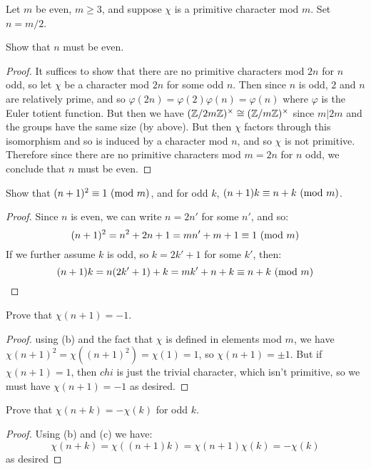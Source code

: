\documentclass[11pt]{article}
\begin{document}
Let $m$ be even, $m \ge 3$, and suppose $\chi$ is a primitive character mod $m$. Set $n = m/2$.

Show that $n$ must be even.
\begin{proof}
  It suffices to show that there are no primitive characters mod $2n$ for $n$ odd, so let $\chi$ be a character mod $2n$ for some odd $n$.
  Then since $n$ is odd, $2$ and $n$ are relatively prime, and so $\varphi(2n) = \varphi(2)\varphi(n) = \varphi(n)$ where $\varphi$ is the Euler totient function.
  But then we have $(\mathbb{Z}/2m\mathbb{Z})^\times \cong (\mathbb{Z}/m\mathbb{Z})^\times$ since $m | 2m$ and the groups have the same size (by above).
  But then $\chi$ factors through this isomorphism and so is induced by a character mod $n$, and so $\chi$ is not primitive.
  Therefore since there are no primitive characters mod $m = 2n$ for $n$ odd, we conclude that $n$ must be even.
\end{proof}

Show that $(n+1)^2 \equiv 1\ (\text{mod}\ m)$, and for odd $k$, $(n+1)k \equiv n+k\ (\text{mod}\ m)$.
\begin{proof}
  Since $n$ is even, we can write $n = 2n'$ for some $n'$, and so:
  \begin{equation*}
    (n+1)^2 = n^2 + 2n + 1 = mn' + m + 1 \equiv 1\ (\text{mod}\ m)
  \end{equation*}
  If we further assume $k$ is odd, so $k = 2k'+1$ for some $k'$, then:
  \begin{equation*}
    (n+1)k = n(2k'+1) + k = mk' + n + k \equiv n + k\ (\text{mod}\ m)
  \end{equation*}
\end{proof}

Prove that $\chi(n + 1) = -1$.
\begin{proof}
  using (b) and the fact that $\chi$ is defined in elements mod $m$, we have $\chi(n + 1)^2 = \chi((n+1)^2) = \chi(1) = 1$, so $\chi(n+1) = \pm 1$.
  But if $\chi(n+1) = 1$, then $chi$ is just the trivial character, which isn't primitive, so we must have $\chi(n+1) = -1$ as desired.
\end{proof}

Prove that $\chi(n + k) = - \chi(k)$ for odd $k$.
\begin{proof}
  Using (b) and (c) we have:
  \begin{equation*}
    \chi(n+k) = \chi((n+1)k) = \chi(n+1)\chi(k) = -\chi(k)
  \end{equation*}
  as desired
\end{proof}
\end{document}
